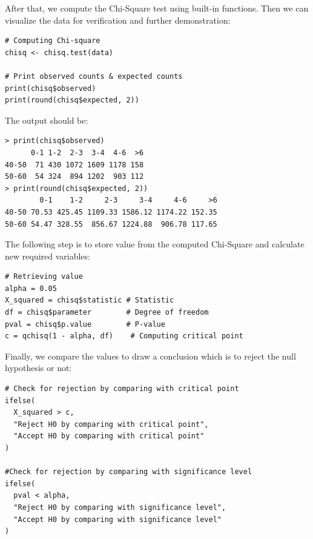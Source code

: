 \documentclass[a4paper]{article}
\numberwithin{equation}{section}
\begin{document}
After that, we compute the Chi-Square test using built-in functions. Then we can visualize the data for verification and further demonstration:
\begin{mdframed}[leftline=false,rightline=false,backgroundcolor=magenta!10,nobreak=true]
  \begin{verbatim}
# Computing Chi-square
chisq <- chisq.test(data)

# Print observed counts & expected counts
print(chisq$observed)
print(round(chisq$expected, 2))
  \end{verbatim}
\end{mdframed}

The output should be:
\begin{mdframed}[leftline=false,rightline=false,backgroundcolor=magenta!10,nobreak=true]
  \begin{verbatim}
> print(chisq$observed)
      0-1 1-2  2-3  3-4  4-6  >6
40-50  71 430 1072 1609 1178 158
50-60  54 324  894 1202  903 112
> print(round(chisq$expected, 2))
        0-1    1-2     2-3     3-4     4-6     >6
40-50 70.53 425.45 1109.33 1586.12 1174.22 152.35
50-60 54.47 328.55  856.67 1224.88  906.78 117.65
  \end{verbatim}
\end{mdframed}

The following step is to store value from the computed Chi-Square and calculate new required variables:
\begin{mdframed}[leftline=false,rightline=false,backgroundcolor=magenta!10,nobreak=true]
  \begin{verbatim}
# Retrieving value
alpha = 0.05
X_squared = chisq$statistic # Statistic
df = chisq$parameter        # Degree of freedom
pval = chisq$p.value        # P-value
c = qchisq(1 - alpha, df)    # Computing critical point
  \end{verbatim}
\end{mdframed}

Finally, we compare the values to draw a conclusion which is to reject the null hypothesis or not:
\begin{mdframed}[leftline=false,rightline=false,backgroundcolor=magenta!10,nobreak=true]
  \begin{verbatim}
# Check for rejection by comparing with critical point
ifelse(
  X_squared > c,
  "Reject H0 by comparing with critical point",
  "Accept H0 by comparing with critical point"
)

#Check for rejection by comparing with significance level
ifelse(
  pval < alpha,
  "Reject H0 by comparing with significance level",
  "Accept H0 by comparing with significance level"
)
  \end{verbatim}
\end{mdframed}
\end{document}
